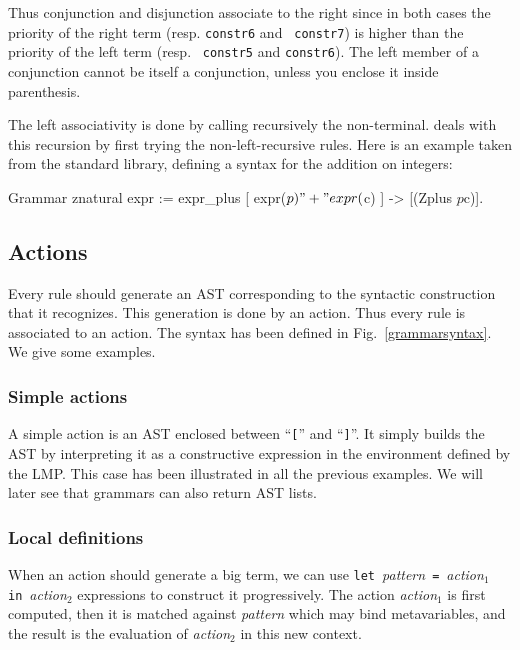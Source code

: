 Thus conjunction and disjunction associate to the right since in both
cases the priority of the right term (resp. {\tt constr6} and {\tt
constr7}) is higher than the priority of the left term (resp. {\tt
constr5} and {\tt constr6}). The left member of a conjunction cannot
be itself a conjunction, unless you enclose it inside parenthesis.

The left associativity is done by calling recursively the
non-terminal. {\camlpppp} deals with this recursion by first trying
the non-left-recursive rules. Here is an example taken from the
standard library, defining a syntax for the addition on integers:

\begin{coq_example*}
Grammar znatural expr :=
  expr_plus [ expr($p) "+" expr($c) ] -> [(Zplus $p $c)].
\end{coq_example*}



\subsection{Actions}
\label{GramAction}

Every rule should generate an AST corresponding to the syntactic
construction that it recognizes. This generation is done by an
action. Thus every rule is associated to an action. The syntax has
been defined in Fig.~\ref{grammarsyntax}. We give some examples.

\subsubsection{Simple actions}

A simple action is an AST enclosed between ``\verb+[+'' and
``\verb+]+''. It simply builds the AST by interpreting it as a
constructive expression in the environment defined by the LMP. This
case has been illustrated in all the previous examples.  We will later
see that grammars can also return AST lists.


\subsubsection{Local definitions}

When an action should generate a big term, we can use
\texttt{let}~\textsl{pattern}~\texttt{=}~\textsl{action}$_1$~%
\texttt{in}~\textsl{action}$_2$ expressions to
construct it progressively. The action \textsl{action}$_1$ is first
computed, then it is matched against \textsl{pattern} which may bind
metavariables, and the result is the evaluation of \textsl{action}$_2$
in this new context.

